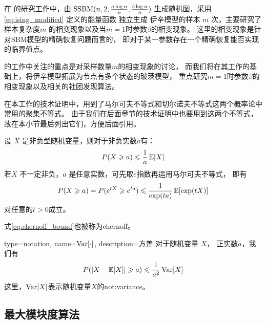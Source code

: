 在\citet{ye2020exact} 的研究工作中，由 $\operatorname{SSBM}(n,2,\frac{a \log n}{n}, \frac{b \log n}{n})$
生成随机图，采用 \eqref{eq:ising_modified} 定义的能量函数
独立生成 伊辛模型的样本 $m$ 次，主要研究了样本复杂度$m$
的相变现象以及当$m=1$时参数$\beta$的相变现象。
这里的相变现象是针对SBM模型的精确恢复问题而言的，
即对于某一参数存在一个精确恢复能否实现的临界值点。

\citet{ye2020exact} 的工作中关注的重点是对采样数量$m$的相变现象的讨论，
而我们将在其工作的基础上，将伊辛模型拓展为节点有多个状态的玻茨模型，
重点研究$m=1$时参数$\beta$的相变现象以及相关的社团发现算法。

\citet{ye2020exact} 在本工作的技术证明中，用到了马尔可夫不等式和切尔诺夫不等式这两个概率论中常用的聚集不等式。
由于我们在后面章节的技术证明中也要用到这两个不等式，故在本小节最后列出它们，方便后面引用。

\begin{lemma} 
  设 $X$ 是非负型随机变量，则对于非负实数$a$有：
  \begin{equation}
    P(X\geqslant a) \leqslant {1 \over a} \operatorname{\mathbb{E}}[X]   
  \end{equation}
   若$X$ 不一定非负，$a$ 是任意实数，可先取$e$指数再运用马尔可夫不等式，
   即有
   \begin{equation}\label{eq:chernoff_bound}
    P(X\geqslant a) = P(e^{tX} \geqslant e^{ta}) \leqslant { 1 \over \exp(ta)} \operatorname{\mathbb{E}}[\exp(tX)]
   \end{equation}
   对任意的$t>0$成立。

   式\eqref{eq:chernoff_bound}也被称为\gls{chernoff}。
\end{lemma}
\begin{lemma}
{
  type=notation,
  name={$\operatorname{\mathrm{Var}}[\cdot]$},
  description={方差}
}
  对于随机变量 $X$， 正实数$a$，我们有
  \begin{equation}
    P(\lvert X-\operatorname{\mathbb{E}}[X]\rvert \geqslant a) \leqslant {1 \over a^2} \operatorname{\mathrm{Var}}[X]
  \end{equation}
  这里，$\operatorname{\mathrm{Var}}[X]$表示随机变量$X$的\glsdesc{not:variance}。
\end{lemma}



\subsection{最大模块度算法}

